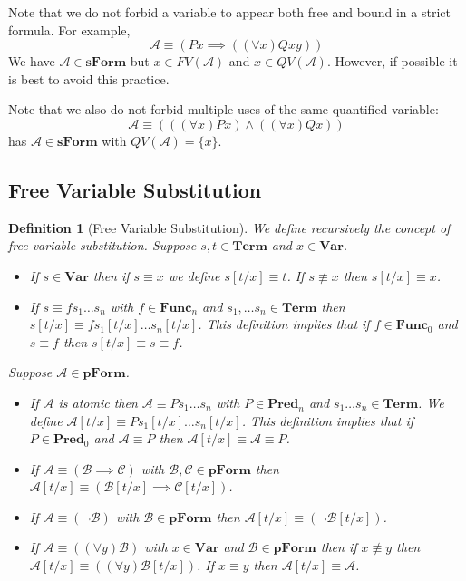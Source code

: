 \documentclass[12pt]{article}
\theoremstyle{break}
\newtheorem{definition}{Definition}[section]
\theoremstyle{break}
\theoremstyle{break}
\theoremstyle{break}
\theoremstyle{break}
\newtheorem{informal definition}[definition]{Informal Definition}
\newcommand{\mc}[1]{\mathcal{#1}}
\begin{document}
Note that we do not forbid a variable to appear both free and bound in a strict formula.
For example,
$$
\mc{A} \equiv (Px \implies ((\forall x) Qxy))
$$
We have $\mc{A}\in\textbf{sForm}$ but $x\in FV(\mc{A})$ and $x\in QV(\mc{A})$.
However, if possible it is best to avoid this practice.

Note that we also do not forbid multiple uses of the same quantified variable:
$$
\mc{A}\equiv (((\forall x) Px) \land ((\forall x) Qx))
$$
has $\mc{A}\in\textbf{sForm}$ with $QV(\mc{A}) = \{x\}$.

\subsection{Free Variable Substitution}

\begin{definition}[Free Variable Substitution]
We define recursively the concept of free variable substitution.
Suppose $s, t \in \textbf{Term}$ and $x\in \textbf{Var}$.
\begin{itemize}
\item{If $s\in\textbf{Var}$ then if $s\equiv x$ we define $s[t/x] \equiv t$. If $s\not \equiv x$ then $s[t/x] \equiv x$.}
\item{If $s \equiv fs_1\ldots s_n$ with $f\in\textbf{Func}_n$ and $s_1, \ldots s_n \in \textbf{Term}$ then $s[t/x] \equiv fs_1[t/x]\ldots s_n[t/x]$. This definition implies that if $f\in \textbf{Func}_0$ and $s\equiv f$ then $s[t/x] \equiv s \equiv f$.}
\end{itemize}

Suppose $\mc{A} \in \textbf{pForm}$.
\begin{itemize}
\item{If $\mc{A}$ is atomic then $\mc{A} \equiv Ps_1\ldots s_n$ with $P\in\textbf{Pred}_n$ and $s_1\ldots s_n\in\textbf{Term}$. We define $\mc{A}[t/x] \equiv Ps_1[t/x]\ldots s_n[t/x]$. This definition implies that if $P\in\textbf{Pred}_0$ and $\mc{A}\equiv P$ then $\mc{A}[t/x] \equiv \mc{A} \equiv P$.}
\item{If $\mc{A} \equiv (\mc{B} \implies \mc{C})$ with $\mc{B}, \mc{C}\in\textbf{pForm}$ then $\mc{A}[t/x] \equiv (\mc{B}[t/x] \implies \mc{C}[t/x])$.}
\item{If $\mc{A} \equiv (\lnot \mc{B})$ with $\mc{B}\in\textbf{pForm}$ then $\mc{A}[t/x] \equiv (\lnot \mc{B}[t/x])$.}
\item{If $\mc{A} \equiv ((\forall y) \mc{B})$ with $x\in\textbf{Var}$ and $\mc{B}\in\textbf{pForm}$ then if $x\not \equiv y$ then $\mc{A}[t/x] \equiv ((\forall y) \mc{B}[t/x])$. If $x \equiv y$ then $\mc{A}[t/x] \equiv \mc{A}$.}
\end{itemize}

\end{definition}
\end{document}
